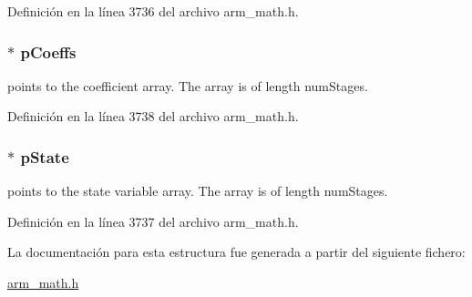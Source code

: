 Definición en la línea 3736 del archivo arm\+\_\+math.\+h.

\subsubsection[{\texorpdfstring{p\+Coeffs}{pCoeffs}}]{$\ast$ p\+Coeffs}\hypertarget{structarm__fir__lattice__instance__q15_a7ca181a37f714d174445f486bebce26f}{}\label{structarm__fir__lattice__instance__q15_a7ca181a37f714d174445f486bebce26f}
points to the coefficient array. The array is of length num\+Stages. 

Definición en la línea 3738 del archivo arm\+\_\+math.\+h.

\subsubsection[{\texorpdfstring{p\+State}{pState}}]{$\ast$ p\+State}\hypertarget{structarm__fir__lattice__instance__q15_ae29dfdb736374fcddaeaec4b7770170c}{}\label{structarm__fir__lattice__instance__q15_ae29dfdb736374fcddaeaec4b7770170c}
points to the state variable array. The array is of length num\+Stages. 

Definición en la línea 3737 del archivo arm\+\_\+math.\+h.



La documentación para esta estructura fue generada a partir del siguiente fichero\+:\begin{DoxyCompactItemize}
\item 
\hyperlink{arm__math_8h}{arm\+\_\+math.\+h}\end{DoxyCompactItemize}
